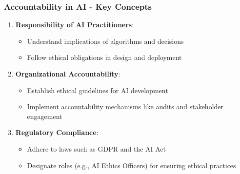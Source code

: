\documentclass{beamer}
\begin{document}
\begin{frame}[fragile]
    \frametitle{Accountability in AI - Key Concepts}
    \begin{enumerate}
        \item \textbf{Responsibility of AI Practitioners}:
            \begin{itemize}
                \item Understand implications of algorithms and decisions
                \item Follow ethical obligations in design and deployment
            \end{itemize}
        
        \item \textbf{Organizational Accountability}:
            \begin{itemize}
                \item Establish ethical guidelines for AI development
                \item Implement accountability mechanisms like audits and stakeholder engagement
            \end{itemize}

        \item \textbf{Regulatory Compliance}:
            \begin{itemize}
                \item Adhere to laws such as GDPR and the AI Act
                \item Designate roles (e.g., AI Ethics Officers) for ensuring ethical practices
            \end{itemize}
    \end{enumerate}
\end{frame}
\end{document}
